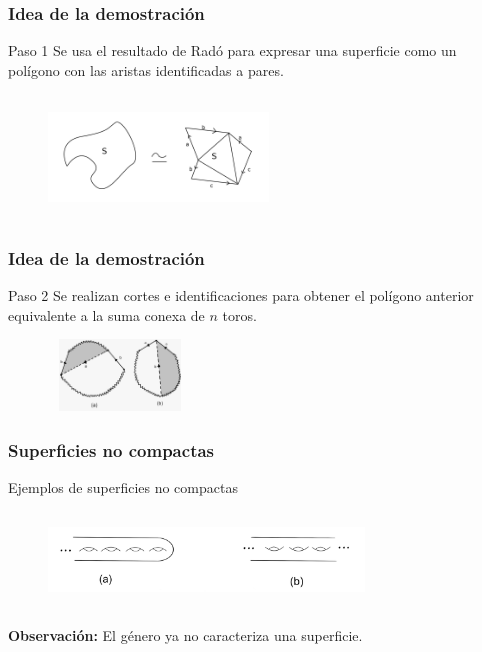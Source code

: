\documentclass{beamer}
\begin{document}

\begin{frame}
\frametitle{Idea de la demostración}

\begin{block}{Paso 1}
Se usa el resultado de Radó para expresar una superficie como un polígono con las aristas identificadas a pares.
\begin{figure}[htb]
\begin{center}
\includegraphics[width=2.3in,height=1.3in]{imagenes/paso1.png} 
\end{center}
\end{figure}
\end{block}

 
\end{frame}



\begin{frame}
\frametitle{Idea de la demostración}
\begin{block}{Paso 2}
Se realizan cortes e identificaciones para obtener el polígono anterior equivalente a la suma conexa de $n$ toros.


\begin{figure}[htb]
\begin{center}
\includegraphics[width=1.5in,height=0.75in]{imagenes/paso4.jpeg} 
\end{center}
\end{figure}

\end{block}
 
\end{frame}



\begin{frame}
\frametitle{Superficies no compactas}

Ejemplos de superficies no compactas
\begin{figure}[htb]
\begin{center}
\includegraphics[width=3.3in,height=1in]{imagenes/ejemplonocompactas.png} 
\end{center}
\end{figure}
\textbf{Observación:} El género ya no caracteriza una superficie.

\end{frame}
\end{document}
